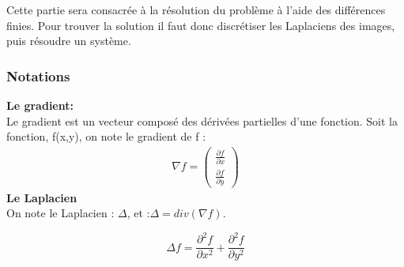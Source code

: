 Cette partie sera consacrée à la résolution du problème à l'aide des différences finies. Pour trouver la solution il faut donc discrétiser les Laplaciens des images, puis résoudre un système.
 \subsubsection{Notations}
\textbf{Le gradient: }\\
Le gradient est un vecteur composé des dérivées partielles d'une fonction. Soit la fonction, f(x,y), on note le gradient de f : 
\begin{equation*}
\begin{aligned}
\nabla f = \begin{pmatrix}
\frac{\partial f}{\partial x}\\
\frac{\partial f}{\partial y}
\end{pmatrix}
\end{aligned}
\end{equation*}
\textbf{Le Laplacien}\\
On note le Laplacien : $\Delta$, et :$\Delta = div(\nabla f)$.
\begin{center}
\begin{equation*}
    \Delta f  = \frac{\partial^2 f}{\partial x^2}+ \frac{\partial ^2 f}{\partial y^2}
\end{equation*}
\end{center}

